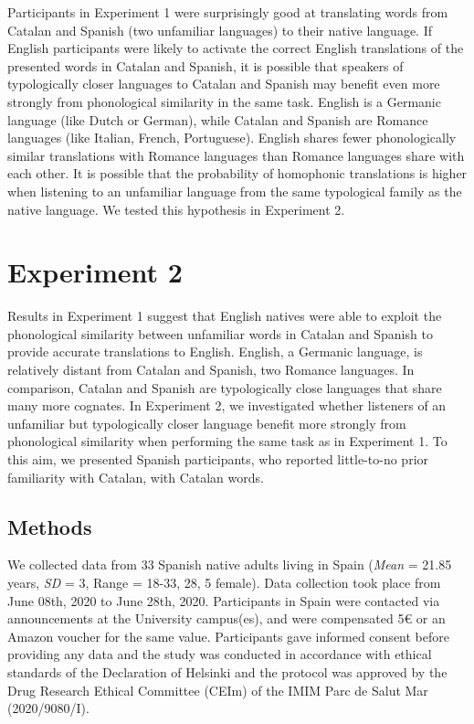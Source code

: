 \documentclass[
]{article}
\begin{document}
Participants in Experiment 1 were surprisingly good at translating words
from Catalan and Spanish (two unfamiliar languages) to their native
language. If English participants were likely to activate the correct
English translations of the presented words in Catalan and Spanish, it
is possible that speakers of typologically closer languages to Catalan
and Spanish may benefit even more strongly from phonological similarity
in the same task. English is a Germanic language (like Dutch or German),
while Catalan and Spanish are Romance languages (like Italian, French,
Portuguese). English shares fewer phonologically similar translations
with Romance languages than Romance languages share with each other. It
is possible that the probability of homophonic translations is higher
when listening to an unfamiliar language from the same typological
family as the native language. We tested this hypothesis in Experiment
2.

\section{Experiment 2}\label{experiment-2}

Results in Experiment 1 suggest that English natives were able to
exploit the phonological similarity between unfamiliar words in Catalan
and Spanish to provide accurate translations to English. English, a
Germanic language, is relatively distant from Catalan and Spanish, two
Romance languages. In comparison, Catalan and Spanish are typologically
close languages that share many more cognates. In Experiment 2, we
investigated whether listeners of an unfamiliar but typologically closer
language benefit more strongly from phonological similarity when
performing the same task as in Experiment 1. To this aim, we presented
Spanish participants, who reported little-to-no prior familiarity with
Catalan, with Catalan words.

\subsection{Methods}\label{methods-1}

We collected data from 33 Spanish native adults living in Spain
(\emph{Mean} = 21.85 years, \emph{SD} = 3, Range = 18-33, 28, 5 female).
Data collection took place from June 08th, 2020 to June 28th, 2020.
Participants in Spain were contacted via announcements at the University
campus(es), and were compensated 5€ or an Amazon voucher for the same
value. Participants gave informed consent before providing any data and
the study was conducted in accordance with ethical standards of the
Declaration of Helsinki and the protocol was approved by the Drug
Research Ethical Committee (CEIm) of the IMIM Parc de Salut Mar
(2020/9080/I).
\end{document}
